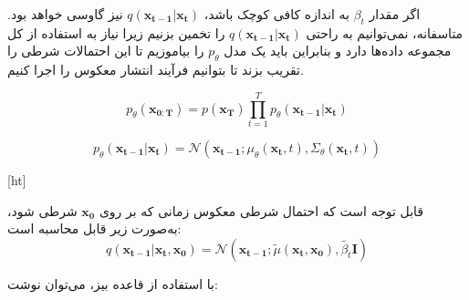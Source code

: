 اگر مقدار $\beta_t$ به اندازه کافی کوچک باشد، $ q(\mathbf{x_{t-1}}|\mathbf{x_t}) $ نیز گاوسی خواهد بود. متاسفانه، نمی‌توانیم به راحتی $ q(\mathbf{x_{t-1}}|\mathbf{x_t}) $ را تخمین بزنیم زیرا نیاز به استفاده از کل مجموعه داده‌ها دارد و بنابراین باید یک مدل $ p_\theta $ را بیاموزیم تا این احتمالات شرطی را تقریب بزند تا بتوانیم فرآیند انتشار معکوس را اجرا کنیم.

\begin{equation}
	p_\theta(\mathbf{x_{0:T}}) = p(\mathbf{x_T}) \prod_{t=1}^{T} p_\theta(\mathbf{x_{t-1}}|\mathbf{x_t})
\end{equation}

\begin{equation}
	p_\theta(\mathbf{x_{t-1}}|\mathbf{x_t}) = \mathcal{N}(\mathbf{x_{t-1}}; \mu_\theta(\mathbf{x_t}, t), \Sigma_\theta(\mathbf{x_t}, t))
\end{equation}


[ht]



قابل توجه است که احتمال شرطی معکوس زمانی که بر روی $\mathbf{x_0}$ شرطی شود، به‌صورت زیر قابل محاسبه است:
\begin{equation}
	q(\mathbf{x_{t-1}}|\mathbf{x_t}, \mathbf{x_0}) = \mathcal{N}(\mathbf{x_{t-1}}; \tilde{\mu}(\mathbf{x_t}, \mathbf{x_0}), \tilde{\beta_t} \mathbf{I})
\end{equation}

با استفاده از قاعده بیز، می‌توان نوشت:

